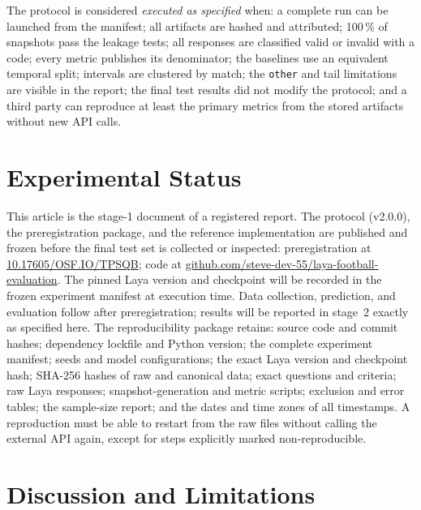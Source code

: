\documentclass[11pt]{article}
\newcommand{\GitHubURL}{\href{https://github.com/steve-dev-55/laya-football-evaluation}{github.com/steve-dev-55/laya-football-evaluation}}
\newcommand{\OsfDOI}{\href{https://doi.org/10.17605/OSF.IO/TPSQB}{10.17605/OSF.IO/TPSQB}}
\begin{document}
The protocol is considered \emph{executed as specified} when: a complete run
can be launched from the manifest; all artifacts are hashed and attributed;
100\,\% of snapshots pass the leakage tests; all responses are classified
valid or invalid with a code; every metric publishes its denominator; the
baselines use an equivalent temporal split; intervals are clustered by match;
the \texttt{other} and tail limitations are visible in the report; the final
test results did not modify the protocol; and a third party can reproduce at
least the primary metrics from the stored artifacts without new API calls.

\section{Experimental Status}
\label{sec:status}

This article is the stage-1 document of a registered report. The protocol
(v2.0.0), the preregistration package, and the reference implementation are
published and frozen before the final test set is collected or inspected:
preregistration at \OsfDOI{}; code at \GitHubURL{}. The pinned Laya version
and checkpoint will be recorded in the frozen experiment manifest at
execution time. Data collection, prediction, and evaluation follow after
preregistration; results will be reported in stage~2 exactly as specified
here. The reproducibility package retains: source code and commit hashes;
dependency lockfile and Python version; the complete experiment manifest;
seeds and model configurations; the exact Laya version and checkpoint hash;
SHA-256 hashes of raw and canonical data; exact questions and criteria; raw
Laya responses; snapshot-generation and metric scripts; exclusion and error
tables; the sample-size report; and the dates and time zones of all
timestamps. A reproduction must be able to restart from the raw files
without calling the external API again, except for steps explicitly marked
non-reproducible.

\section{Discussion and Limitations}
\label{sec:discussion}
\end{document}
